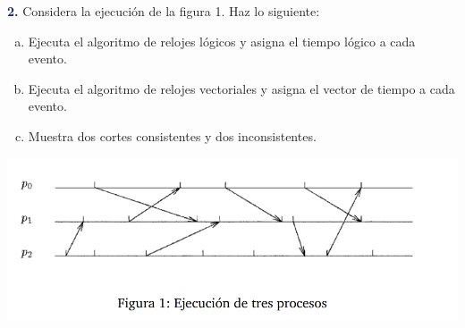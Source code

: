 \newpage
\textbf{\textcolor{MidnightBlue}{2.}}
Considera la ejecución de la figura 1. Haz lo siguiente:
\begin{enumerate}[a)]
\item Ejecuta el algoritmo de relojes lógicos y asigna el tiempo lógico a cada evento.
\item Ejecuta el algoritmo de relojes vectoriales y asigna el vector de tiempo
a cada evento.
\item Muestra dos cortes consistentes y dos inconsistentes.
\end{enumerate}
\begin{center}
    \includegraphics[scale=0.5]{Grapho.png}
    \end{center}
